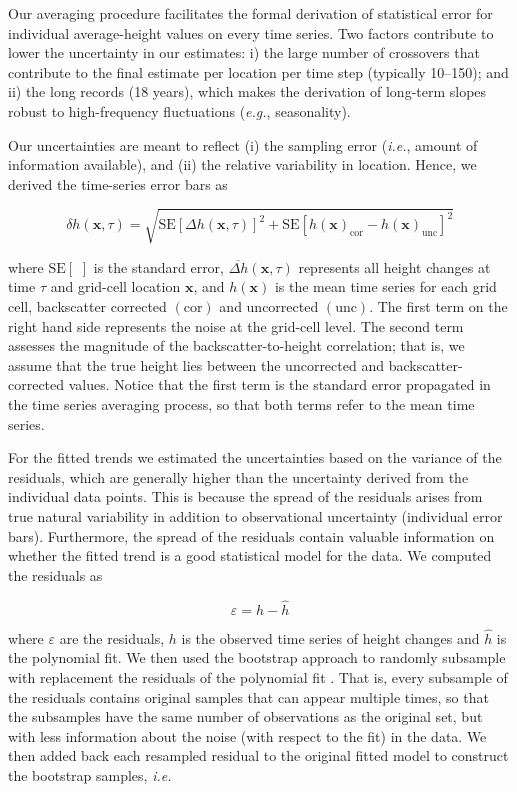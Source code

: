 Our averaging procedure facilitates the formal derivation of statistical error
for individual average-height values on every time series. Two factors
contribute to lower the uncertainty in our estimates: i) the large number of
crossovers that contribute to the final estimate per location per time step
(typically 10--150); and ii) the long records (18 years), which makes the
derivation of long-term slopes robust to high-frequency fluctuations ({\it e.g.},
seasonality).

Our uncertainties are meant to reflect (i) the sampling error ({\it i.e.}, amount of
information available), and (ii) the relative variability in location. Hence,
we derived the time-series error bars as

\begin{equation}
  \delta h(\mathbf x, \tau) = \sqrt{\text{SE}[\Delta h(\mathbf x, \tau)]^2 + 
  \text{SE}[h(\mathbf x)_\text{cor} - h(\mathbf x)_\text{unc}]^2}
\end{equation}

where $\text{SE}[\,\,]$ is the standard error,
$\overbar{\Delta h}(\mathbf x,\tau)$ represents all height changes at time
$\tau$ and grid-cell location $\mathbf x$, and $h(\mathbf x)$ is the mean time
series for each grid cell, backscatter corrected $(\text{cor})$ and
uncorrected $(\text{unc})$. The first term on the right hand side represents
the noise at the grid-cell level. The second term assesses the magnitude of
the backscatter-to-height correlation; that is, we assume that the true height
lies between the uncorrected and backscatter-corrected values. Notice that the
first term is the standard error propagated in the time series averaging
process, so that both terms refer to the mean time series.

For the fitted trends we estimated the uncertainties based on the variance of
the residuals, which are generally higher than the uncertainty derived from
the individual data points. This is because the spread of the residuals arises
from true natural variability in addition to observational uncertainty
(individual error bars). Furthermore, the spread of the residuals contain
valuable information on whether the fitted trend is a good statistical model
for the data. We computed the residuals as

\begin{equation}
  \varepsilon = h - \hat h
\end{equation}

where $\varepsilon$ are the residuals, $h$ is the observed time series of
height changes and $\hat h$ is the polynomial fit. We then used the bootstrap
approach to randomly subsample with replacement the residuals of the polynomial
fit \parencite{Efron1993}. That is, every subsample of the residuals contains
original samples that can appear multiple times, so that the subsamples have
the same number of observations as the original set, but with less information
about the noise (with respect to the fit) in the data. We then added back each
resampled residual to the original fitted model to construct the bootstrap
samples, {\it i.e.}

